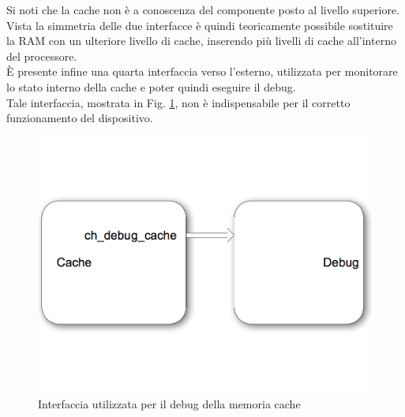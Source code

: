 Si noti che la cache non \`e a conoscenza del componente posto al livello superiore. Vista la simmetria delle due interfacce \`e quindi teoricamente possibile sostituire la RAM con un ulteriore livello di cache, inserendo pi\`u livelli di cache all'interno del processore.\\


\`E presente infine una quarta interfaccia verso l'esterno, utilizzata per monitorare lo stato interno della cache e poter quindi eseguire il debug.\\
Tale interfaccia, mostrata in Fig. \ref{fig:int_deb}, non \`e indispensabile per il corretto funzionamento del dispositivo.

\begin{figure}[h!]
\centering
\includegraphics[width=\textwidth]{img/cache/debug.png}
\caption{Interfaccia utilizzata per il debug della memoria cache}
\label{fig:int_deb}
\end{figure}















